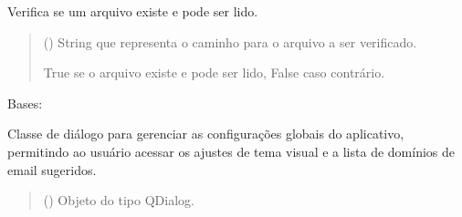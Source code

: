 \documentclass[letterpaper,10pt,english]{sphinxmanual}
\begin{document}

\begin{fulllineitems}
\label{\detokenize{api/app:app.file_exists}}
\pysigstartsignatures
\pysiglinewithargsret
{}
{}
{}
\pysigstopsignatures
\sphinxAtStartPar
Verifica se um arquivo existe e pode ser lido.
\begin{quote}\begin{description}
\sphinxAtStartPar
{} () \textendash{} String que representa o caminho para o arquivo a ser verificado.

\sphinxAtStartPar
True se o arquivo existe e pode ser lido, False caso contrário.

\sphinxAtStartPar
{}

\end{description}\end{quote}

\end{fulllineitems}


\begin{fulllineitems}
\label{\detokenize{api/app:app.SettingsDialog}}
\pysigstartsignatures
\pysiglinewithargsret
{}
{}
{}
\pysigstopsignatures
\sphinxAtStartPar
Bases: 

\sphinxAtStartPar
Classe de diálogo para gerenciar as configurações globais do aplicativo, permitindo ao usuário acessar os ajustes de tema visual e a lista de domínios de e\sphinxhyphen{}mail sugeridos.
\begin{quote}\begin{description}
\sphinxAtStartPar
{} () \textendash{} Objeto do tipo QDialog.

\end{description}\end{quote}

\end{fulllineitems}
\end{document}
